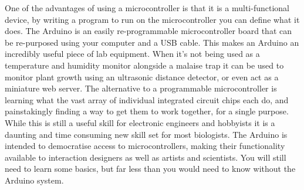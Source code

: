 \documentclass[
]{book}
\begin{document}
One of the advantages of using a microcontroller is that it is a multi-functional device, by writing a program to run on the microcontroller you can define what it does. The Arduino is an easily re-programmable microcontroller board that can be re-purposed using your computer and a USB cable. This makes an Arduino an incredibly useful piece of lab equipment. When it's not being used as a temperature and humidity monitor alongside a malaise trap it can be used to monitor plant growth using an ultrasonic distance detector, or even act as a miniature web server. The alternative to a programmable microcontroller is learning what the vast array of individual integrated circuit chips each do, and painstakingly finding a way to get them to work together, for a single purpose. While this is still a useful skill for electronic engineers and hobbyists it is a daunting and time consuming new skill set for most biologists. The Arduino is intended to democratise access to microcontrollers, making their functionality available to interaction designers as well as artists and scientists. You will still need to learn some basics, but far less than you would need to know without the Arduino system.


\end{document}
